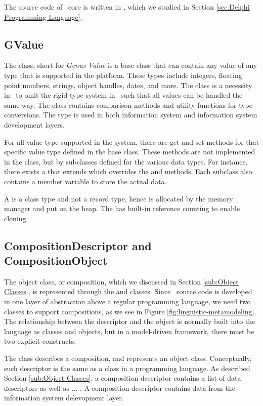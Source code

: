 The source code of \gap~core is written in \delphi, which we studied in Section \ref{sec:Delphi Programming Language}.

\subsection{GValue}
\label{sub:GValue}
The  class, short for \textit{Genus Value} is a base class that can contain any value of any type that is supported in the platform. These types include integers, floating point numbers, strings, object handles, dates, and more. The  class is a necessity in \gap~to omit the rigid type system in \delphi~such that all values can be handled the same way. The class contains comparison methods and utility functions for type conversions. The  type is used in both information system and information system development layers.

For all value type supported in the system, there are get and set methods for that specific value type defined in the base class. These methods are not implemented in the  class, but by subclasses defined for the various data types. For instance, there exists a  that extends  which overrides the  and  methods. Each subclass also contains a member variable to store the actual data.

A  is a class type and not a record type, hence is allocated by the memory manager and put on the heap. The  has built-in reference counting to enable cloning.

\subsection{CompositionDescriptor and CompositionObject}
\label{sub:CompositionDescriptor}
The object class, or composition, which we discussed in Section \ref{sub:Object Classes}, is represented through the  and  classes. Since \gap~source code is developed in one layer of abstraction above a regular programming language, we need two classes to support compositions, as we see in Figure \ref{fig:linguistic-metamodeling}. The relationship between the descriptor and the object is normally built into the language as classes and objects, but in a model-driven framework, there must be two explicit constructs.

The  class describes a composition, and represents an object class. Conceptually, such descriptor is the same as a class in a programming language. As described Section \ref{sub:Object Classes}, a composition descriptor contains a list of data descriptors as well as ... . A composition descriptor contains data from the information system delevopment layer.

